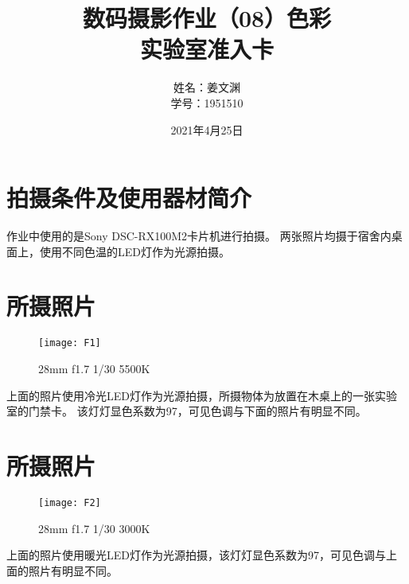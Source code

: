 \documentclass[cn,black,9pt,normal]{elegantnote}
\title{数码摄影作业（08）色彩\\\small{实验室准入卡}}
\author{姓名：姜文渊\\学号：1951510}
\date{2021年4月25日}
\begin{document}
\maketitle


\section*{拍摄条件及使用器材简介}

作业中使用的是Sony DSC-RX100M2卡片机进行拍摄。
两张照片均摄于宿舍内桌面上，使用不同色温的LED灯作为光源拍摄。



\section{所摄照片}
\begin{figure}[H]
    \centering
    \texttt{[image: F1]}
    \caption{28mm f1.7 1/30 5500K}
    \label{F-02}
\end{figure}

上面的照片使用冷光LED灯作为光源拍摄，所摄物体为放置在木桌上的一张实验室的门禁卡。
该灯灯显色系数为97，可见色调与下面的照片有明显不同。

\section{所摄照片}
\begin{figure}[H]
    \centering
    \texttt{[image: F2]}
    \caption{28mm f1.7 1/30 3000K}
    \label{F-01}
\end{figure}

上面的照片使用暖光LED灯作为光源拍摄，该灯灯显色系数为97，可见色调与上面的照片有明显不同。

\end{document}
